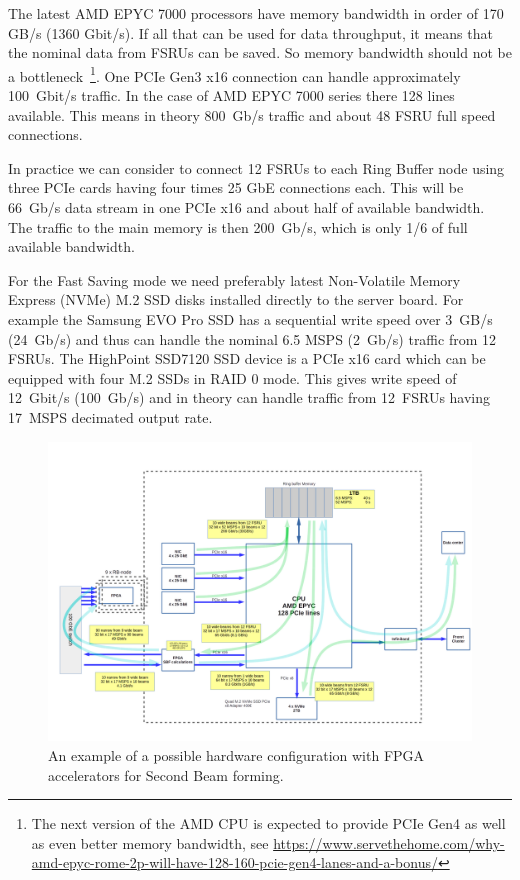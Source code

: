 \documentclass[12pt,a4paper]{article}
\begin{document}
The latest AMD EPYC 7000 processors have memory bandwidth in order of 170 GB/s (1360 Gbit/s).
If all that can be used for data throughput, it means that the nominal data from FSRUs can be saved. 
So memory bandwidth should not be a bottleneck~\footnote{The next version of the AMD CPU is expected to provide PCIe Gen4 as well as even better memory bandwidth, see {\url{https://www.servethehome.com/why-amd-epyc-rome-2p-will-have-128-160-pcie-gen4-lanes-and-a-bonus/}}}.  
One PCIe Gen3 x16 connection can handle approximately 100~Gbit/s traffic. 
In the case of AMD EPYC 7000 series there 128 lines available. 
This means in theory 800~Gb/s traffic and about 48 FSRU full speed connections.

In practice we can consider to connect 12 FSRUs to each Ring Buffer node using three PCIe cards having four times 25 GbE connections each. 
This will be 66~Gb/s data stream in one PCIe x16 and about half of available bandwidth. 
The traffic to the main memory is then 200~Gb/s, which is only 1/6 of full available bandwidth.  

For the Fast Saving mode we need preferably latest Non-Volatile Memory Express (NVMe) M.2 SSD disks installed directly to the server board. 
For example the Samsung EVO Pro SSD has a sequential write speed over 3~GB/s (24~Gb/s) and thus can handle the nominal 6.5 MSPS (2~Gb/s) traffic from 12 FSRUs. 
The HighPoint SSD7120 SSD device is a PCIe x16 card which can be equipped with four M.2 SSDs in RAID 0 mode. This gives write speed of 12~Gbit/s (100~Gb/s) and in theory can handle traffic from 12~FSRUs having 17~MSPS decimated output rate.
\begin{figure}[h!]
\includegraphics[scale=0.3]{E3DDS_D2_ring_buffer_node_dataflows.png}
\caption{An example of a possible hardware configuration with FPGA accelerators for Second Beam forming.}
\end{figure}
\end{document}
